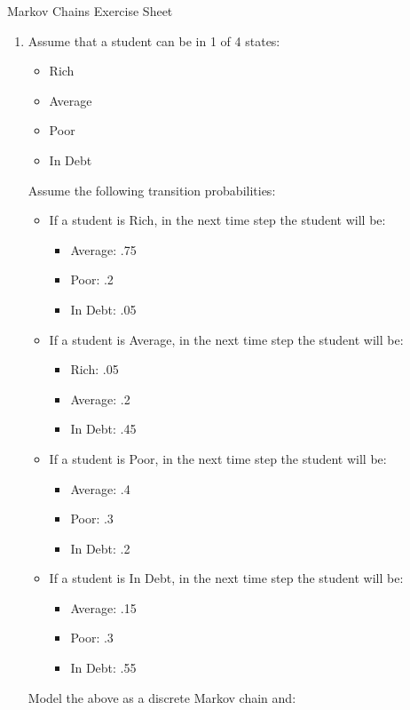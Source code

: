 \documentclass[12pt]{article}
\begin{document}
\begin{center}
\Huge{Markov Chains Exercise Sheet}\\
\date{\tiny{Last updated: \today.}}
\end{center}

\begin{enumerate}
\item Assume that a student can be in 1 of 4 states:
\begin{itemize}
	\item Rich
	\item Average
	\item Poor
	\item In Debt
\end{itemize}
Assume the following transition probabilities:

\begin{itemize}
	\item If a student is Rich, in the next time step the student will be:
	\begin{itemize}
		\item Average: .75
		\item Poor: .2
		\item In Debt: .05
	\end{itemize}
	\item If a student is Average, in the next time step the student will be:
	\begin{itemize}
		\item Rich: .05
		\item Average: .2
		\item In Debt: .45
	\end{itemize}
	\item If a student is Poor, in the next time step the student will be:
	\begin{itemize}
		\item Average: .4
		\item Poor: .3
		\item In Debt: .2
	\end{itemize}
	\item If a student is In Debt, in the next time step the student will be:
	\begin{itemize}
		\item Average: .15
		\item Poor: .3
		\item In Debt: .55
	\end{itemize}
\end{itemize}Model the above as a discrete Markov chain and:
\begin{enumerate}

\end{enumerate}
\end{enumerate}
\end{document}
